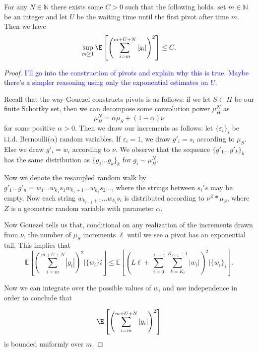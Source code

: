\begin{lem}\label{lem: small values mn} For any $ N \in \mathbb{N} $ there exists some $ C > 0$ such that the following holds. set $ m \in \mathbb{N} $ be an integer and let $ U $ be the waiting time until the first pivot after time $ m $. Then we have
    $$\sup_{m\ge 1}\E\left[\left( \sum_{i=m}^{m+U+N}|g_i| \right)^2\right]\le C.$$
\end{lem}
\begin{proof}
	\textcolor{blue} { I'll go into the construction of pivots and explain why this is true. Maybe there's a simpler reasoning using only the exponential estimates on $ U $}.

	Recall that the way Gouezel constructs pivots is as follows: if we let $ S \subset H$ be our finite Schottky set, then we can decompose some convolution power $ \mu _{H} ^{N} $ as \[ \mu _{H} ^{N} = \alpha \mu _{S} + (1-\alpha)\nu \] for some positive $ \alpha >0$. Then we draw our increments as follows: let $ \{ \varepsilon _{i} \} _{i} $ be i.i.d. Bernoulli($ \alpha $) random variables. If $ \varepsilon _{i} = 1 $, we draw $ g' _{i} = s _{i} $ according to $ \mu _{S} $. Else we draw $g' _{i} = w _{i} $ according to $ \nu $. We observe that the sequence $ \{ g '_{1}...g' _{k} \} _{k} $ has the same distribution as $ \{ g _{1}...g _{k} \} _{k} $ for $ g _{i} \sim \mu _{H} ^{N} $.

	Now we denote the resampled random walk by $ g' _{1}...g' _{n} =w _{1}...w _{k _{1}} s _{1} w _{k _{1} +1} ...w _{k _{2}} s _{2} ... $, where the strings between $ s _{i}'s $ may be empty. Now each string $ w _{k _{i-1} +1}...w _{k _{i}} s _{i}  $ is distributed according to $ \nu ^{Z}* \mu _{S} $, where $ Z $ is a geometric random variable with parameter $ \alpha $. 

	Now Gouezel tells us that, conditional on any realization of the increments drawn from $ \nu $, the number of $ \mu _{S} $ increments $ \ell $ until we see a pivot has an exponential tail. This implies that
	\[ \mathbb{E} \left[\left(\sum_{i = m}^{m+U+N} |g _{i}| \right) ^{2} | \{ w _{i} \} i \right] \leq \mathbb{E} \left[\left(L\ell + \sum_{i = 0}^{\ell-1} \sum_{k = K _{i}}^{K _{i+1} -1} |w _{i}|\right) ^{2} | \{ w _{i} \} _{i} \right] .\] 

	Now we can integrate over the possible values of $ w _{i} $ and use independence in order to conclude that 

	\[ \E\left[\left( \sum_{i=m}^{m+U+N}|g_i| \right)^2\right] \] is bounded uniformly over $ m $.
    \end{proof}

